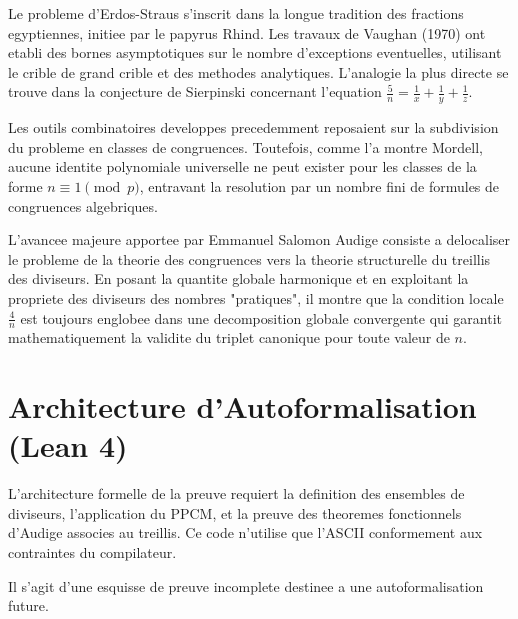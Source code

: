 \documentclass[11pt,a4paper]{article}
\begin{document}
Le probleme d'Erdos-Straus s'inscrit dans la longue tradition des fractions egyptiennes, initiee par le papyrus Rhind. Les travaux de Vaughan (1970) ont etabli des bornes asymptotiques sur le nombre d'exceptions eventuelles, utilisant le crible de grand crible et des methodes analytiques. L'analogie la plus directe se trouve dans la conjecture de Sierpinski concernant l'equation $\frac{5}{n} = \frac{1}{x} + \frac{1}{y} + \frac{1}{z}$.

Les outils combinatoires developpes precedemment reposaient sur la subdivision du probleme en classes de congruences. Toutefois, comme l'a montre Mordell, aucune identite polynomiale universelle ne peut exister pour les classes de la forme $n \equiv 1 \pmod{p}$, entravant la resolution par un nombre fini de formules de congruences algebriques.

L'avancee majeure apportee par Emmanuel Salomon Audige consiste a delocaliser le probleme de la theorie des congruences vers la theorie structurelle du treillis des diviseurs. En posant la quantite globale harmonique et en exploitant la propriete des diviseurs des nombres "pratiques", il montre que la condition locale $\frac{4}{n}$ est toujours englobee dans une decomposition globale convergente qui garantit mathematiquement la validite du triplet canonique pour toute valeur de $n$.

\section{Architecture d'Autoformalisation (Lean 4)}

L'architecture formelle de la preuve requiert la definition des ensembles de diviseurs, l'application du PPCM, et la preuve des theoremes fonctionnels d'Audige associes au treillis. Ce code n'utilise que l'ASCII conformement aux contraintes du compilateur.

Il s'agit d'une esquisse de preuve incomplete destinee a une autoformalisation future.
\end{document}
